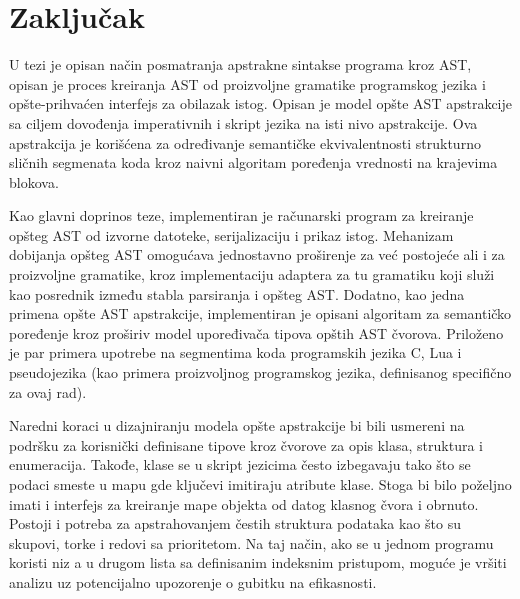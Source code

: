 \chapter{Zaključak}
\label{chp:conclusion}

U tezi je opisan način posmatranja apstrakne sintakse programa kroz AST, opisan je proces kreiranja AST od proizvoljne gramatike programskog jezika i opšte-prihvaćen interfejs za obilazak istog. Opisan je model opšte AST apstrakcije sa ciljem dovođenja imperativnih i skript jezika na isti nivo apstrakcije. Ova apstrakcija je korišćena za određivanje semantičke ekvivalentnosti strukturno sličnih segmenata koda kroz naivni algoritam poređenja vrednosti na krajevima blokova.

Kao glavni doprinos teze, implementiran je računarski program za kreiranje opšteg AST od izvorne datoteke, serijalizaciju i prikaz istog. Mehanizam dobijanja opšteg AST omogućava jednostavno proširenje za već postojeće ali i za proizvoljne gramatike, kroz implementaciju adaptera za tu gramatiku koji služi kao posrednik između stabla parsiranja i opšteg AST. Dodatno, kao jedna primena opšte AST apstrakcije, implementiran je opisani algoritam za semantičko poređenje kroz proširiv model upoređivača tipova opštih AST čvorova. Priloženo je par primera upotrebe na segmentima koda programskih jezika C, Lua i pseudojezika (kao primera proizvoljnog programskog jezika, definisanog specifično za ovaj rad).

Naredni koraci u dizajniranju modela opšte apstrakcije bi bili usmereni na podršku za korisnički definisane tipove kroz čvorove za opis klasa, struktura i enumeracija. Takođe, klase se u skript jezicima često izbegavaju tako što se podaci smeste u mapu gde ključevi imitiraju atribute klase. Stoga bi bilo poželjno imati i interfejs za kreiranje mape objekta od datog klasnog čvora i obrnuto. Postoji i potreba za apstrahovanjem čestih struktura podataka kao što su skupovi, torke i redovi sa prioritetom. Na taj način, ako se u jednom programu koristi niz a u drugom lista sa definisanim indeksnim pristupom, moguće je vršiti analizu uz potencijalno upozorenje o gubitku na efikasnosti.
